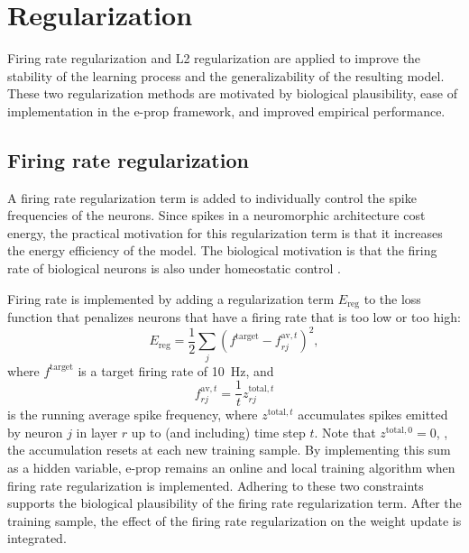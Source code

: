 \section{Regularization}

	Firing rate regularization and L2 regularization are applied to improve the stability of the learning process and the generalizability of the resulting model.
	These two regularization methods are motivated by biological plausibility, ease of implementation in the e-prop framework, and improved empirical performance.

	\subsection{Firing rate regularization}
		A firing rate regularization term is added to individually control the spike frequencies of the neurons.
		Since spikes in a neuromorphic architecture cost energy, the practical motivation for this regularization term is that it increases the energy efficiency of the model.
		The biological motivation is that the firing rate of biological neurons is also under homeostatic control \citep{erickson2006activity}.

		Firing rate is implemented by adding a regularization term $E_\text{reg}$ to the loss function that penalizes neurons that have a firing rate that is too low or too high:
		\begin{equation}
			E_\text{reg} = \frac{1}{2}\sum_j\left(f^\text{target} - f^{\text{av}, t}_{rj}\right)^2,
		\end{equation}
		where $f^\text{target}$ is a target firing rate of \SI{10}{\Hz}, and
		\begin{equation}
		f^{\text{av},t}_{rj} = \frac{1}{t} z^{\text{total},t}_{rj}
		\end{equation}
		is the running average spike frequency, where $z^{\text{total},t}$ accumulates spikes emitted by neuron $j$ in layer $r$ up to (and including) time step $t$.
		Note that $z^{\text{total},0} = 0$, \ie, the accumulation resets at each new training sample.
		By implementing this sum as a hidden variable, e-prop remains an online and local training algorithm when firing rate regularization is implemented.
		Adhering to these two constraints supports the biological plausibility of the firing rate regularization term.
		After the training sample, the effect of the firing rate regularization on the weight update is integrated.

